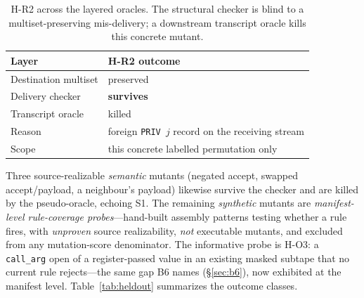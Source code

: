 \documentclass[conference]{IEEEtran}
\newcommand{\code}[1]{\texttt{\small #1}}
\newcommand{\callarg}{\code{call\_arg}}
\begin{document}
\begin{table}[t]
\centering\footnotesize\renewcommand{\arraystretch}{1.2}
\caption{H-R2 across the layered oracles. The structural checker is blind to a
multiset-preserving mis-delivery; a downstream transcript oracle kills this concrete mutant.}
\label{tab:hr2}
\begin{tabular}{@{}ll@{}}
\toprule
\textbf{Layer} & \textbf{H-R2 outcome} \\
\midrule
Destination multiset & preserved \\
Delivery checker & \textbf{survives} \\
Transcript oracle & killed \\
Reason & foreign \code{PRIV\,$j$} record on the receiving stream \\
Scope & this concrete labelled permutation only \\
\bottomrule
\end{tabular}
\end{table}

Three source-realizable \emph{semantic} mutants (negated accept, swapped accept/payload, a
neighbour's payload) likewise survive the checker and are killed by the pseudo-oracle,
echoing S1. The remaining \emph{synthetic} mutants are \emph{manifest-level rule-coverage
probes}---hand-built assembly patterns testing whether a rule fires, with \emph{unproven}
source realizability, \emph{not} executable mutants, and excluded from any mutation-score
denominator. The informative probe is H-O3: a \callarg{} open of a register-passed value in
an existing masked subtape that no current rule rejects---the same gap B6 names
(\S\ref{sec:b6}), now exhibited at the manifest level. Table~\ref{tab:heldout} summarizes the
outcome classes.
\end{document}
